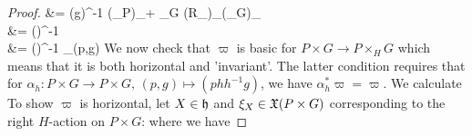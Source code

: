 \documentclass{article}
\begin{document}
\begin{proof}
{		&= \Ad(g\gamma)^{-1} \circ \omega \circ (\pi_P)_\ast + \vartheta_G \circ (R_\gamma)_\ast \circ (\pi_G)_\ast \\
		&= \Ad(\gamma)^{-1}  \\
		&= \Ad(\gamma)^{-1} \circ \varpi_{(p,g)}
	}
	We now check that $\varpi$ is basic for $P \times G \to P\times_H G$ which means that it is both horizontal and 'invariant'. The latter condition requires that for $\alpha_h : P \times G \to P \times G, \, (p,g) \mapsto (ph h^{-1}g)$, we have $\alpha_h^\ast \varpi = \varpi$. We calculate 
	To show $\varpi$ is horizontal, let $X \in \mathfrak{h}$ and $\xi_X \in \mathfrak{X}(P \times G)$ corresponding to the right $H$-action on $P \times G$:
	where we have 
\end{proof}
\end{document}
